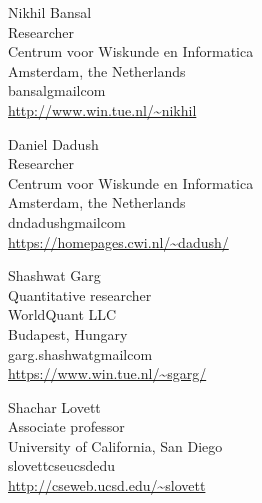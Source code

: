 \documentclass{toc}
\begin{document}
%
%
%
%
%
\begin{tocauthors}
\begin{tocinfo}[bansal]
 Nikhil Bansal\\
 Researcher\\
 Centrum voor Wiskunde en Informatica\\ 
 Amsterdam, the Netherlands\\  
 bansal\tocat{}gmail\tocdot{}com \\   %
 \url{http://www.win.tue.nl/~nikhil}  
\end{tocinfo}
\begin{tocinfo}[dadush]
 Daniel Dadush\\
 Researcher\\
 Centrum voor Wiskunde en Informatica\\   %
 Amsterdam, the Netherlands\\
 dndadush\tocat{}gmail\tocdot{}com \\   %
 \url{https://homepages.cwi.nl/~dadush/}      %
\end{tocinfo}
\begin{tocinfo}[garg]
  Shashwat Garg \\   %
%
  Quantitative researcher\\  %
  WorldQuant LLC\\
  Budapest, Hungary\\
  garg.shashwat\tocat{}gmail\tocdot{}com \\
  \url{https://www.win.tue.nl/~sgarg/}
\end{tocinfo}
%
\begin{tocinfo}[lovett]
 Shachar Lovett\\
 Associate professor\\
 University of California, San Diego\\
 slovett\tocat{}cse\tocdot{}ucsd\tocdot{}edu \\
 \url{http://cseweb.ucsd.edu/~slovett}
\end{tocinfo}

\end{tocauthors}
\end{document}
